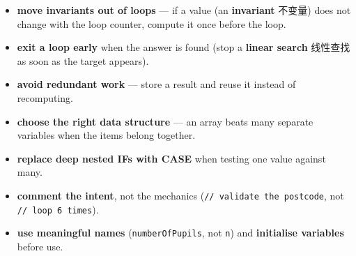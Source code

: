\documentclass[11pt]{article}
\begin{document}
\begin{itemize}
\item \textbf{move invariants out of loops} — if a value (an \textbf{invariant} 不变量) does not change with the loop counter, compute it once before the loop.

\item \textbf{exit a loop early} when the answer is found (stop a \textbf{linear search} 线性查找 as soon as the target appears).

\item \textbf{avoid redundant work} — store a result and reuse it instead of recomputing.

\item \textbf{choose the right data structure} — an array beats many separate variables when the items belong together.

\item \textbf{replace deep nested IFs with CASE} when testing one value against many.

\item \textbf{comment the intent}, not the mechanics (\texttt{// validate the postcode}, not \texttt{// loop 6 times}).

\item \textbf{use meaningful names} (\texttt{numberOfPupils}, not \texttt{n}) and \textbf{initialise variables} before use.

\end{itemize}
\end{document}
